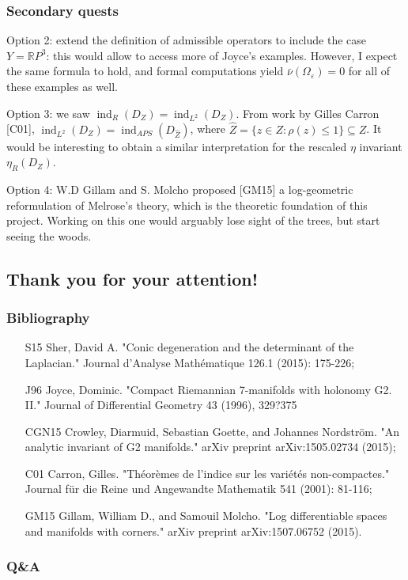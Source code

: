 \documentclass{beamer}
\DeclareMathOperator{\ind}{ind}
\newcommand{\ve}{\varepsilon}
\newcommand{\bb}{\mathbb}
\begin{document}
\begin{frame}
\frametitle{Secondary quests}
Option 2: extend the definition of admissible operators to include the case $Y=\bb RP^3$: this would allow to access more of Joyce's examples. However, I expect the same formula to hold, and formal computations yield $\bar\nu(\Omega_\ve)=0$ for all of these examples as well.\newline\par

Option 3: we saw $\ind_R(D_Z)=\ind_{L^2}(D_Z)$. From work by Gilles Carron [C01], $\ind_{L^2}(D_Z)=\ind_{APS}(D_{\hat Z})$, where $\hat Z = \{z\in Z:\rho(z)\leq 1\}\subseteq Z$. It would be interesting to obtain a similar interpretation for the rescaled $\eta$ invariant $\eta_R(D_Z)$.\newline\par

Option 4: W.D Gillam and S. Molcho proposed [GM15] a log-geometric reformulation of Melrose's theory, which is the theoretic foundation of this project. Working on this one would arguably lose sight of the trees, but start seeing the woods.
\end{frame}




\subsection*{Thank you for your attention!}
\begin{frame}
\frametitle{Bibliography}
\begin{itemize}
\item [S15] Sher, David A. "Conic degeneration and the determinant of the Laplacian." Journal d'Analyse Math\'ematique 126.1 (2015): 175-226;
\item [J96] Joyce, Dominic. "Compact Riemannian 7-manifolds with holonomy G2. II." Journal of Differential Geometry 43 (1996), 329?375
\item [CGN15] Crowley, Diarmuid, Sebastian Goette, and Johannes Nordstr\"om. "An analytic invariant of G2 manifolds." arXiv preprint arXiv:1505.02734 (2015);
\item [C01] Carron, Gilles. "Th\'eor\`emes de l'indice sur les vari\'et\'es non-compactes." Journal f\"ur die Reine und Angewandte Mathematik 541 (2001): 81-116;
\item [GM15] Gillam, William D., and Samouil Molcho. "Log differentiable spaces and manifolds with corners." arXiv preprint arXiv:1507.06752 (2015).
\end{itemize}
\end{frame}

\begin{frame}
\frametitle{Q\&A}

\end{frame}

\end{document}
